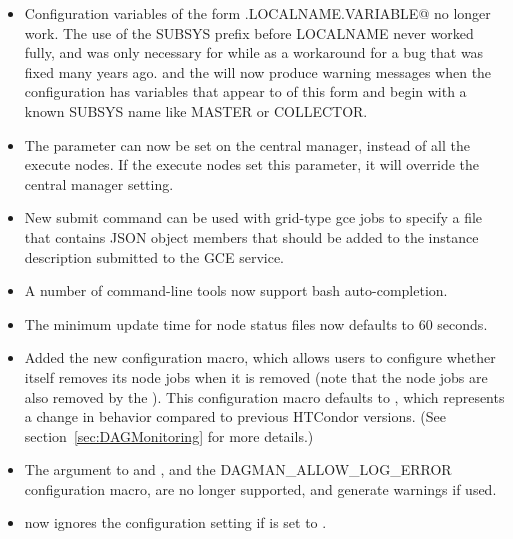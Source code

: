 \begin{itemize}

\item Configuration variables of the form \verb@SUBSYS.LOCALNAME.VARIABLE@ no longer work.
The use of the SUBSYS prefix before LOCALNAME never worked fully, and was only necessary for while
as a workaround for a bug that was fixed many years ago.  and the  will
now produce warning messages when the configuration has variables that appear to of this form and
begin with a known SUBSYS name like MASTER or COLLECTOR.

\item The  parameter can now be set on the central manager,
instead of all the execute nodes.  If the execute nodes set this parameter, it
will override the central manager setting.

\item New submit command  can be used with
grid-type gce jobs to specify a file that contains JSON object members
that should be added to the instance description submitted to the GCE
service.

\item A number of command-line tools now support bash auto-completion.

\item The minimum update time for  node status files
now defaults to 60 seconds.

\item Added the new  configuration
macro, which allows users to configure whether  itself
removes its node jobs when it is removed (note that the
node jobs are also removed by the ).
This configuration macro defaults to , which represents
a change in behavior compared to previous HTCondor versions.
(See section~\ref{sec:DAGMonitoring} for more details.)

\item The  argument to  and
, and the DAGMAN\_ALLOW\_LOG\_ERROR configuration
macro, are no longer supported, and generate warnings if used.

\item {} now ignores the
 configuration setting if
 is set to .


\end{itemize}

